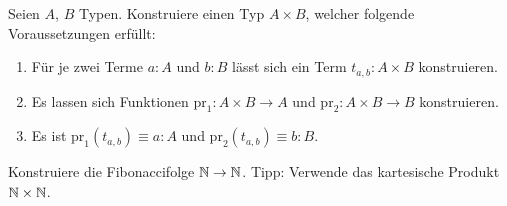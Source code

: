 \documentclass{uebung}
\begin{document}
\begin{exercise}
  Seien $A$, $B$ Typen.
  Konstruiere einen Typ $A\times B$, welcher folgende Voraussetzungen erfüllt:
  \begin{enumerate}
    \item Für je zwei Terme $a:A$ und $b:B$ lässt sich ein Term $t_{a,b}:A\times B$ konstruieren.
    \item Es lassen sich Funktionen $\mathrm{pr}_1:A \times B\to A$ und $\mathrm{pr}_2:A\times B\to B$ konstruieren.
    \item Es ist $\mathrm{pr}_1(t_{a,b})\equiv a:A$ und $\mathrm{pr}_2(t_{a,b})\equiv b:B$.
  \end{enumerate}
\end{exercise}

\begin{exercise}[Fibonacci]
  Konstruiere die Fibonaccifolge $\mathbb{N}\to\mathbb{N}$.
  {\tiny Tipp: Verwende das kartesische Produkt $\mathbb{N}\times\mathbb{N}$.}
\end{exercise}
\end{document}
